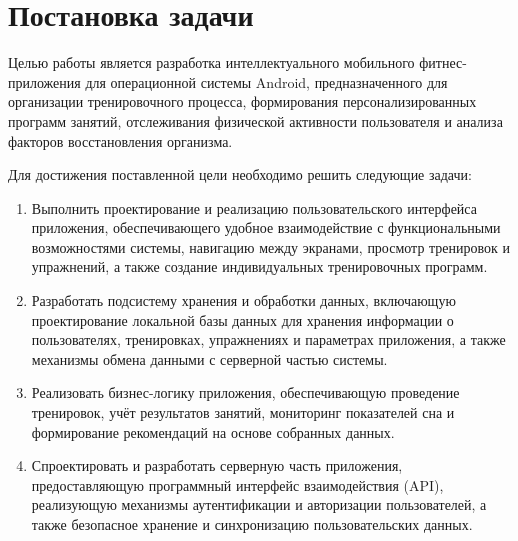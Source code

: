 \section{Постановка задачи}

Целью работы является разработка интеллектуального мобильного фитнес-приложения для операционной системы Android, предназначенного для организации тренировочного процесса, формирования персонализированных программ занятий, отслеживания физической активности пользователя и анализа факторов восстановления организма.

Для достижения поставленной цели необходимо решить следующие задачи:

\begin{enumerate}
\item Выполнить проектирование и реализацию пользовательского интерфейса приложения, обеспечивающего удобное взаимодействие с функциональными возможностями системы, навигацию между экранами, просмотр тренировок и упражнений, а также создание индивидуальных тренировочных программ.

\item Разработать подсистему хранения и обработки данных, включающую проектирование локальной базы данных для хранения информации о пользователях, тренировках, упражнениях и параметрах приложения, а также механизмы обмена данными с серверной частью системы.

\item Реализовать бизнес-логику приложения, обеспечивающую проведение тренировок, учёт результатов занятий, мониторинг показателей сна и формирование рекомендаций на основе собранных данных.

\item Спроектировать и разработать серверную часть приложения, предоставляющую программный интерфейс взаимодействия (API), реализующую механизмы аутентификации и авторизации пользователей, а также безопасное хранение и синхронизацию пользовательских данных.


\end{enumerate}
